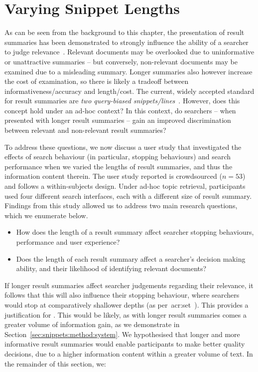 \section{Varying Snippet Lengths}\label{chap:snippets:user}
As can be seen from the background to this chapter, the presentation of result summaries has been demonstrated to strongly influence the ability of a searcher to judge relevance~\citep{he2012bridging}. Relevant documents may be overlooked due to uninformative or unattractive summaries -- but conversely, non-relevant documents may be examined due to a misleading summary. Longer summaries also however increase the cost of examination, so there is likely a tradeoff between informativeness/accuracy and length/cost. The current, widely accepted standard for result summaries are \emph{two query-biased snippets/lines}~\citep{hearst2009_search}. However, does this concept hold under an ad-hoc context? In this context, do searchers -- when presented with longer result summaries -- gain an improved discrimination between relevant and non-relevant result summaries?

To address these questions, we now discuss a user study that investigated the effects of search behaviour (in particular, stopping behaviours) and search performance when we varied the lengths of result summaries, and thus the information content therein. The user study reported is crowdsourced ($n=53$) and follows a within-subjects design. Under ad-hoc topic retrieval, participants used four different search interfaces, each with a different size of result summary. Findings from this study allowed us to address two main research questions, which we enumerate below.

\begin{itemize}
    \item{ How does the length of a result summary affect searcher stopping behaviours, performance and user experience?}
    \item{ Does the length of each result summary affect a searcher's decision making ability, and their likelihood of identifying relevant documents?}
\end{itemize}

If longer result summaries affect searcher judgements regarding their relevance, it follows that this will also influence their stopping behaviour, where searchers would stop at comparatively shallower depths (as per~\gls{acr:set}~\citep{azzopardi2011economics}). This provides a justification for . This would be likely, as with longer result summaries comes a greater volume of information gain, as we demonstrate in Section~\ref{sec:snippets:method:system}. We hypothesised that longer and more informative result summaries would enable participants to make better quality decisions, due to a higher information content within a greater volume of text. In the remainder of this section, we:

